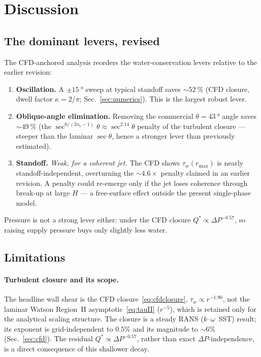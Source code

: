 \documentclass[aps,prfluids,reprint,amsmath,amssymb,floatfix]{revtex4-2}
\begin{document}
\section{Discussion}
\label{sec:discussion}

\subsection{The dominant levers, revised}

The CFD-anchored analysis reorders the water-conservation levers relative to
the earlier revision:
\begin{enumerate}[leftmargin=*]
  \item \textbf{Oscillation.} A $\pm\SI{15}{\degree}$ sweep at typical
  standoff saves $\sim\SI{52}{\percent}$ (CFD closure, dwell factor
  $\kappa = 2/\pi$; Sec.~\ref{sec:numerics}). This is the largest robust
  lever.
  \item \textbf{Oblique-angle elimination.} Removing the commercial
  $\theta = \SI{43}{\degree}$ angle saves $\sim\SI{49}{\percent}$ (the
  $\sec^{6/(2n_t-1)}\theta \approx \sec^{2.14}\theta$ penalty of the
  turbulent closure --- steeper than the laminar $\sec\theta$, hence a
  stronger lever than previously estimated).
  \item \textbf{Standoff.} \emph{Weak, for a coherent jet.} The CFD shows
  $\tau_w(r_\mathrm{max})$ is nearly standoff-independent, overturning the
  $\sim 4.6\times$ penalty claimed in an earlier revision. A penalty could
  re-emerge only if the jet loses coherence through break-up at large $H$ ---
  a free-surface effect outside the present single-phase model.
\end{enumerate}
Pressure is not a strong lever either: under the CFD closure
$Q^* \propto \Delta P^{-0.57}$, so raising supply pressure buys only slightly
less water.

\subsection{Limitations}

\paragraph{Turbulent closure and its scope.}
The headline wall shear is the CFD closure~\eqref{eq:cfdclosure},
$\tau_w \propto r^{-1.90}$, not the laminar Watson Region~II
asymptotic~\eqref{eq:tauII} ($r^{-5}$), which is retained only for the
analytical scaling structure. The closure is a steady RANS
($k$--$\omega$~SST) result; its exponent is grid-independent to $0.5\%$ and
its magnitude to $\sim 6\%$ (Sec.~\ref{sec:cfd}). The residual
$Q^* \propto \Delta P^{-0.57}$, rather than exact $\Delta P$-independence, is
a direct consequence of this shallower decay.
\end{document}
